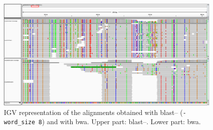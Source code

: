\begin{figure}
\includegraphics[scale=0.45]{img/igv01}
\caption[IGV representation of the alignments obtained with \acrshort{blast}--\blastobam{} and with \acrshort{bwa}.]
{IGV representation of the alignments obtained with \acrshort{blast}--\blastobam{} (\texttt{-word\_size~8}) and with \acrshort{bwa}. Upper part: \gls{blast}--\blastobam{}. Lower part: \gls{bwa}.}
\label{fig:igv}
\end{figure}
